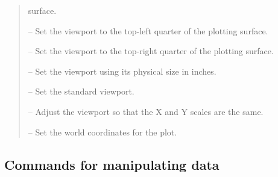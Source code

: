 \documentclass[twoside,11pt]{article}
\newcommand{\htmlref}[2]{#1}
\renewcommand{\_}{\texttt{\symbol{95}}}
\newcommand{\iref} [1]{\htmlref{#1}{#1}}
\begin{document}
\begin {quote}
\begin {description}
    surface.
  \item [\iref{VP\_TL}] -- Set the viewport to the top-left quarter of the
    plotting surface.
  \item [\iref{VP\_TR}] -- Set the viewport to the top-right quarter of the
    plotting surface.
  \item [\iref{VSIZE}] -- Set the viewport using its physical size in inches.
  \item [\iref{VSTAND}] -- Set the standard viewport.
  \item [\iref{WNAD}] -- Adjust the viewport so that the X and Y
    scales are the same.
  \item [\iref{WORLD}] -- Set the world coordinates for the plot.
  \end {description}
\end {quote}
\normalsize


\subsection{Commands for manipulating data}
\end{document}
